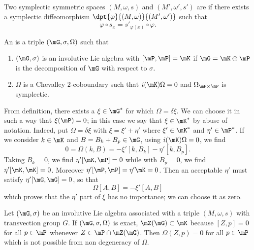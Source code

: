 \begin{definition}
Two symplectic symmetric spaces $(M,\omega,s)$ and $(M',\omega',s')$  are  if there exists a symplectic diffeomorphism $\dpt{\varphi}{(M,\omega)}{(M',\omega')}$ such that 
\begin{equation}
  \varphi\circ s_x=s'_{\varphi(x)}\circ\varphi.
\end{equation}

\end{definition}


\begin{definition}
An  is a triple $(\mG,\sigma,\Omega)$ such that

\begin{enumerate}
\item $(\mG,\sigma)$ is an involutive Lie algebra with $[\mP,\mP]=\mK$ if $\mG=\mK\oplus\mP$ is the decomposition of $\mG$ with respect to $\sigma$.

\item $\Omega$ is a Chevalley $2$-coboundary such that $i(\mK)\Omega=0$ and $\Omega_{\mP\times\mP}$ is symplectic.

\end{enumerate}

\end{definition}

From definition, there exists a $\xi\in\mG^*$ for which $\Omega=\delta\xi$. We can choose it in such a way that $\xi(\mP)=0$; in this case we say that $\xi\in\mK^*$ by abuse of notation. Indeed, put $\Omega=\delta\xi$ with $\xi=\xi'+\eta'$ where $\xi'\in\mK^*$ and $\eta'\in\mP^*$. If we consider $k\in\mK$ and $B=B_k+B_p\in\mG$, using $i(\mK)\Omega=0$, we find
\[ 
  0=\Omega(k,B)=-\xi'[k,B_k]-\eta'[k,B_p].
\]
Taking $B_k=0$, we find $\eta'[\mK,\mP]=0$ while with $B_p=0$, we find $\eta'[\mK,\mK]=0$. Moreover $\eta'[\mP,\mP]=\eta'\mK=0$. Then an acceptable $\eta'$ must satisfy $\eta'[\mG,\mG]=0$, so that
\[ 
  \Omega[A,B]=-\xi'[A,B]
\]
which proves that the $\eta'$ part of $\xi$ has no importance; we can choose it as zero.


Let $(\mG,\sigma)$ be an involutive Lie algebra associated with a triple $(M,\omega,s)$ with transvection group $G$. If $(\mG,\sigma,\Omega)$ is exact, $\mZ(\mG)\subset \mK$ because $[Z,p]=0$ for all $p\in\mP$ whenever $Z\in\mP\cap\mZ(\mG)$. Then $\Omega(Z,p)=0$ for all $p\in \mP$ which is not possible from non degeneracy of $\Omega$.

